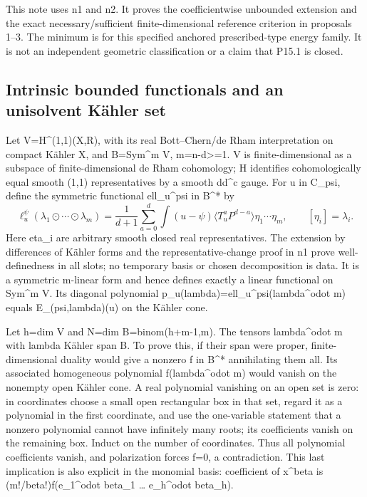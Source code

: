 \documentclass[
]{article}
\begin{document}
This note uses n1 and n2. It proves the coefficientwise unbounded
extension and the exact necessary/sufficient finite-dimensional
reference criterion in proposals 1--3. The minimum is for this specified
anchored prescribed-type energy family. It is not an independent
geometric classification or a claim that P15.1 is closed.

\subsection{Intrinsic bounded functionals and an unisolvent Kähler
set}\label{intrinsic-bounded-functionals-and-an-unisolvent-kuxe4hler-set}

Let V=H\^{}(1,1)(X,R), with its real Bott--Chern/de Rham interpretation
on compact Kähler X, and B=Sym\^{}m V, m=n-d\textgreater=1. V is
finite-dimensional as a subspace of finite-dimensional de Rham
cohomology; H identifies cohomologically equal smooth (1,1)
representatives by a smooth dd\^{}c gauge. For u in C\_psi, define the
symmetric functional ell\_u\^{}psi in B\^{}* by \[
\ell_u^\psi(\lambda_1\odot\cdots\odot\lambda_m)
=\frac1{d+1}\sum_{a=0}^d\int(u-\psi)
\langle T_u^aP^{d-a}\rangle\eta_1\cdots\eta_m,\qquad[\eta_i]=\lambda_i.\tag{13}
\] Here eta\_i are arbitrary smooth closed real representatives. The
extension by differences of Kähler forms and the representative-change
proof in n1 prove well-definedness in all slots; no temporary basis or
chosen decomposition is data. It is a symmetric m-linear form and hence
defines exactly a linear functional on Sym\^{}m V. Its diagonal
polynomial p\_u(lambda)=ell\_u\^{}psi(lambda\^{}odot m) equals
E\_(psi,lambda)(u) on the Kähler cone.

Let h=dim V and N=dim B=binom(h+m-1,m). The tensors lambda\^{}odot m
with lambda Kähler span B. To prove this, if their span were proper,
finite-dimensional duality would give a nonzero f in B\^{}* annihilating
them all. Its associated homogeneous polynomial f(lambda\^{}odot m)
would vanish on the nonempty open Kähler cone. A real polynomial
vanishing on an open set is zero: in coordinates choose a small open
rectangular box in that set, regard it as a polynomial in the first
coordinate, and use the one-variable statement that a nonzero polynomial
cannot have infinitely many roots; its coefficients vanish on the
remaining box. Induct on the number of coordinates. Thus all polynomial
coefficients vanish, and polarization forces f=0, a contradiction. This
last implication is also explicit in the monomial basis: coefficient of
x\^{}beta is (m!/beta!)f(e\_1\^{}odot beta\_1 \ldots{} e\_h\^{}odot
beta\_h).
\end{document}
